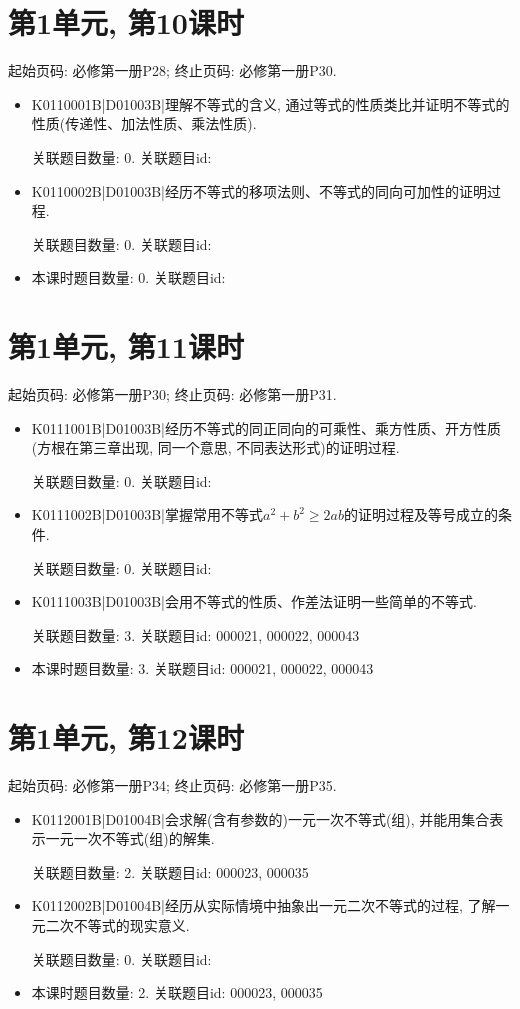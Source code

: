 \section*{第1单元, 第10课时}
起始页码: 必修第一册P28; 终止页码: 必修第一册P30.
\begin{itemize}
\item K0110001B|D01003B|理解不等式的含义, 通过等式的性质类比并证明不等式的性质(传递性、加法性质、乘法性质).

关联题目数量: 0. 关联题目id: 

\item K0110002B|D01003B|经历不等式的移项法则、不等式的同向可加性的证明过程.

关联题目数量: 0. 关联题目id: 

\item 本课时题目数量: 0. 关联题目id: 

\end{itemize}

\section*{第1单元, 第11课时}
起始页码: 必修第一册P30; 终止页码: 必修第一册P31.
\begin{itemize}
\item K0111001B|D01003B|经历不等式的同正同向的可乘性、乘方性质、开方性质(方根在第三章出现, 同一个意思, 不同表达形式)的证明过程.

关联题目数量: 0. 关联题目id: 

\item K0111002B|D01003B|掌握常用不等式$a^2+b^2 \ge 2ab$的证明过程及等号成立的条件.

关联题目数量: 0. 关联题目id: 

\item K0111003B|D01003B|会用不等式的性质、作差法证明一些简单的不等式.

关联题目数量: 3. 关联题目id: 000021, 000022, 000043

\item 本课时题目数量: 3. 关联题目id: 000021, 000022, 000043

\end{itemize}

\section*{第1单元, 第12课时}
起始页码: 必修第一册P34; 终止页码: 必修第一册P35.
\begin{itemize}
\item K0112001B|D01004B|会求解(含有参数的)一元一次不等式(组), 并能用集合表示一元一次不等式(组)的解集.

关联题目数量: 2. 关联题目id: 000023, 000035

\item K0112002B|D01004B|经历从实际情境中抽象出一元二次不等式的过程, 了解一元二次不等式的现实意义.

关联题目数量: 0. 关联题目id: 

\item 本课时题目数量: 2. 关联题目id: 000023, 000035

\end{itemize}


